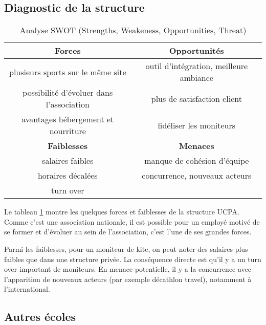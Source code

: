 \documentclass[11pt,a4paper]{report}
\begin{document}
\subsection{Diagnostic de la structure}
\begin{table}[h]
\centering
\begin{tabular}{|c|c|}
        \hline
        \textbf{Forces}                          & \textbf{Opportunités} \\ 
        \hline
        plusieurs sports sur le m\^eme site      &  outil d'intégration, meilleure ambiance\\
        possibilité d'évoluer dans l'association & plus de satisfaction client  \\
        avantages hébergement et nourriture      & fidéliser les moniteurs             \\
        \hline
        \textbf{Faiblesses}                      &  \textbf{Menaces} \\ 
        \hline
        salaires faibles                         & manque de cohésion d'équipe \\
        horaires décalées                         & concurrence, nouveaux acteurs   \\
        turn over                                &                               \\
        \hline
\end{tabular}
\caption{Analyse SWOT (Strengths, Weakeness, Opportunities, Threat)\label{swot}}
\end{table}
Le tableau \ref{swot} montre les quelques forces et faiblesses de la 
structure UCPA. Comme c'est une association nationale, il est 
possible pour un  employé motivé de se former et d'évoluer
au sein de l'association, c'est l'une de ses grandes forces.
 
Parmi les faiblesses, pour un moniteur de kite, on peut noter des
salaires plus faibles que dans une structure privée. 
La conséquence directe est qu'il y a un turn over important de moniteurs.
En menace potentielle, il y a  la concurrence avec 
l’apparition de nouveaux acteurs (par exemple décathlon travel),
notamment à l'international. 

\subsection{Autres écoles}
\end{document}
